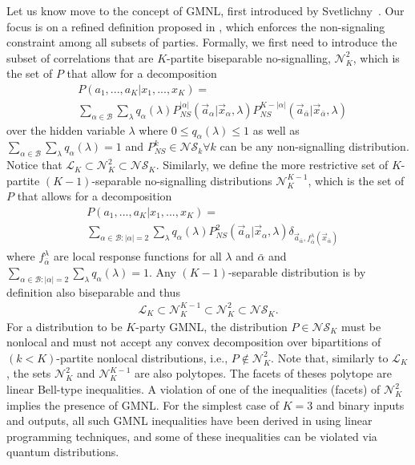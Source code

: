 \documentclass[pra,aps,reprint,superscriptaddress]{revtex4-2}
\theoremstyle{theorem}
\begin{document}
Let us know move to the concept of GMNL, first introduced by Svetlichny~\cite{svetlichny87}. Our focus is on a refined definition proposed in \cite{Bancal2013}, which enforces the non-signaling constraint among all subsets of parties. Formally, we first need to introduce the subset of correlations that are $K$-partite biseparable no-signalling, $\mathcal{N}_{K}^2$,  which is the set of $P$ that allow for a decomposition
\begin{align}\label{gmnl_set}\nonumber
    &P(a_1,...,a_K|x_1,...,x_K) =\\& \sum_{\alpha\in\mathcal{B}}\sum_{\lambda} q_\alpha(\lambda)P^{|\alpha|}_{NS}(\vec{a}_{\alpha} |\vec{x}_{ \alpha},\lambda)P_{NS}^{K-|\alpha|}(\vec a_{\bar \alpha}|\vec x_{\bar \alpha},\lambda)
\end{align}
over the hidden variable $\lambda$ where $0\leq q_\alpha(\lambda)\leq 1$ as well as $\sum_{\alpha\in\mathcal{B}}\sum_{\lambda}q_\alpha(\lambda)=1$ and $P^{k}_{NS} \in \mathcal{NS}_k \forall k$ can be any non-signalling distribution. Notice that $\mathcal{L}_K\subset\mathcal{N}^2_{K}  \subset \mathcal{NS}_{K}$. Similarly, we define the more restrictive set of $K$-partite $(K-1)$-separable no-signalling distributions $\mathcal{N}_K^{K-1}$, which is the set of $P$ that allows for a decomposition
\begin{align}\nonumber
    &P(a_1,...,a_K|x_1,...,x_K) = \\&\sum_{\alpha\in\mathcal{B}:|\alpha|=2}\sum_{\lambda}q_{\alpha}(\lambda)P^2_{NS}(\vec a_\alpha|\vec x_\alpha,\lambda)\delta_{\vec a_{\bar \alpha},f^\lambda_{\bar \alpha}(\vec x_{\bar \alpha})}
\end{align}
where $f^\lambda_{\bar \alpha}$ are local response functions for all $\lambda$ and $\bar \alpha$ and $\sum_{\alpha\in\mathcal{B}:|\alpha|=2}\sum_{\lambda}q_\alpha(\lambda)=1$. Any $(K-1)$-separable distribution is by definition also biseparable and thus
\begin{align}
\mathcal{L}_K\subset\mathcal{N}_K^{K-1}\subset \mathcal{N}^2_{K}  \subset \mathcal{NS}_{K}.
\end{align}
For a distribution to be $K$-party GMNL,
 the distribution $P \in \mathcal{NS}_{K}$ must be nonlocal and must not accept any convex decomposition over bipartitions of $(k<K)$-partite nonlocal distributions, i.e., $P \notin \mathcal{N}^2_K$. Note that, similarly to $\mathcal{L}_K$, the sets $\mathcal{N}^2_K$ and $\mathcal{N}_K^{K-1}$ are also polytopes. The facets of theses polytope are linear Bell-type inequalities. A violation of one of the inequalities (facets) of $\mathcal{N}^2_K$ implies the presence of GMNL. For the simplest case of $K=3$ and binary inputs and outputs, all such GMNL inequalities have been derived in \cite{Bancal2013} using linear programming techniques, and some of these inequalities can be violated via quantum distributions.
\end{document}
